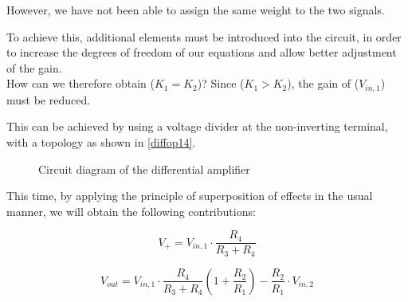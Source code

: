 \documentclass[../main.tex]{subfiles}
\begin{document}
However, we have not been able to assign the same weight to the two signals.
 
To achieve this, additional elements must be introduced into the circuit, in order to increase the degrees of freedom of our equations and allow better adjustment of the gain.\\

How can we therefore obtain ($K_1 = K_2$)? Since ($K_1 > K_2$), the gain of ($V_{in,1}$) must be reduced. 

This can be achieved by using a voltage divider at the non-inverting terminal, with a topology as shown in \autoref{diffop14}.


\begin{figure}[h!]
\begin{center}


\caption{Circuit diagram of the differential amplifier}	
\label{diffop14}
\end{center}	
\end{figure}

This time, by applying the principle of superposition of effects in the usual manner, we will obtain the following contributions:

\begin{equation}
	V_+ = V_{in,1} \cdot \frac{R_4}{R_3+R_4}
\end{equation}

\begin{equation}
	V_{out} = V_{in,1} \cdot \frac{R_4}{R_3+R_4} \left( 1 + \frac{R_2}{R_1} \right) - \frac{R_2}{R_1} \cdot V_{in,2}
\end{equation}
\end{document}
